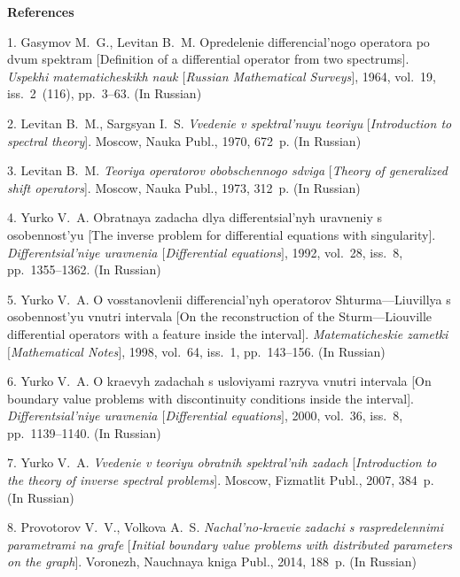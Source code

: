 

{\small



\vskip6mm

\noindent \textbf{References} }

\vskip 2mm

{\footnotesize

1. Gasymov M.~G., Levitan B.~M.  Opredelenie differencial'nogo
operatora po dvum spektram [Definition of a differential operator
from two spectrums]. \emph{Uspekhi matematicheskikh nauk
$[$Russian Mathematical Surveys$]$}, 1964, vol.~19, iss.~2~(116),
pp.~3--63. (In Russian)

2. Levitan B.~M., Sargsyan I.~S. \emph{Vvedenie v spektral'nuyu
teoriyu} [\textit{Introduction to spectral theory}]. Moscow, Nauka
Publ., 1970, 672~p. (In Russian)

3. Levitan B.~M. \emph{Teoriya operatorov obobschennogo sdviga}
[\textit{Theory of generalized shift operators}]. Moscow, Nauka
Publ., 1973, 312~p. (In Russian)

4. Yurko V.~A. Obratnaya zadacha dlya differentsial'nyh uravneniy
s osobennost'yu [The inverse problem for differential equations
with singularity]. \emph{Differentsial'niye uravnenia
$[$Differential equations$]$}, 1992, vol.~28, iss.~8,
pp.~1355--1362. (In Russian)

5. Yurko V.~A. O vosstanovlenii differencial'nyh operatorov
Shturma---Liuvillya s osobennost'yu vnutri intervala [On the
reconstruction of the Sturm---Liouville differential operators
with a feature inside the interval]. \emph{Matematicheskie zametki
$[$Mathematical Notes$]$}, 1998, vol.~64, iss.~1, pp.~143--156.
(In Russian)

6. Yurko V.~A. O kraevyh zadachah s usloviyami razryva vnutri
intervala [On boundary value problems with discontinuity
conditions inside the interval]. \emph{Differentsial'niye
uravnenia $[$Differential equations$]$}, 2000, vol.~36, iss.~8,
pp.~1139--1140. (In Russian)

7. Yurko V.~A. \emph{Vvedenie v teoriyu obratnih spektral'nih
zadach} [\textit{Introduction to the theory of inverse spectral
problems}]. Moscow, Fizmatlit Publ., 2007, 384~p. (In Russian)

8. Provotorov V.~V., Volkova A.~S.  \textit{Nachal'no-kraevie
zadachi s raspredelennimi parametrami na grafe} [\textit{Initial
boundary value problems with distributed parameters on the
graph}]. Voronezh, Nauchnaya kniga Publ.,  2014,  188~p. (In
Russian)

}

